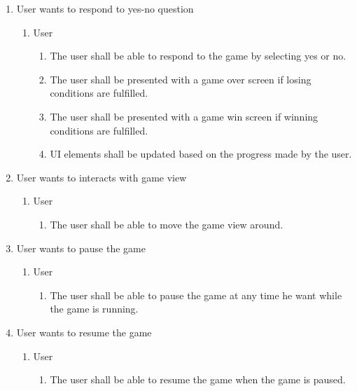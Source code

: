 \documentclass[]{article}
\begin{document}
\begin{enumerate}[{BE}1.]
    \item User wants to respond to yes-no question
    \begin{enumerate}[{VP1}.1]
      \item User
      \begin{enumerate}
        \item The user shall be able to respond to the game by selecting yes or no.
        \item The user shall be presented with a game over screen if losing conditions are fulfilled.
        \item The user shall be presented with a game win screen if winning conditions are fulfilled.
        \item UI elements shall be updated based on the progress made by the user.
      \end{enumerate}
    \end{enumerate}
 
    \item User wants to interacts with game view
    \begin{enumerate}[{VP1}.1]
      \item User
      \begin{enumerate}
        \item The user shall be able to move the game view around.
      \end{enumerate}
    \end{enumerate}
 
    \item User wants to pause the game
    \begin{enumerate}[{VP1}.1]
      \item User
      \begin{enumerate}
        \item The user shall be able to pause the game at any time he want while the game is running.
      \end{enumerate}
    \end{enumerate}
 
    \item User wants to resume the game
    \begin{enumerate}[{VP1}.1]
      \item User
      \begin{enumerate}
        \item The user shall be able to resume the game when the game is paused.
      \end{enumerate}
    \end{enumerate}
 
 
\end{enumerate}
\end{document}
